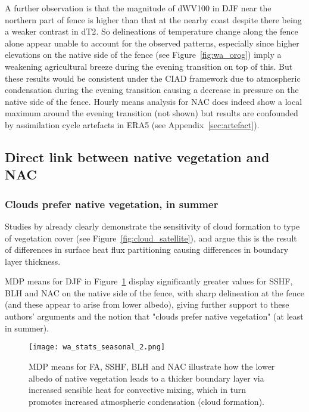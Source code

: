 A further observation is that the magnitude of \ac{dWV100} in \ac{DJF} near the northern part of fence is higher than that at the nearby coast despite there being a weaker contrast in \ac{dT2}. So delineations of temperature change along the fence alone appear unable to account for the observed patterns, especially since higher elevations on the native side of the fence (see Figure~\ref{fig:wa_orog}) imply a weakening agricultural breeze during the evening transition on top of this. But these results would be consistent under the \ac{CIAD} framework due to atmospheric condensation during the evening transition causing a decrease in pressure on the native side of the fence. Hourly means analysis for \ac{NAC} does indeed show a local maximum around the  evening transition (not shown) but results are confounded by assimilation cycle artefacts in \ac{ERA5} (see Appendix~\ref{sec:artefact}).

\subsection{Direct link between native vegetation and NAC}
\label{ssec:native_nac}

\subsubsection{Clouds prefer native vegetation, in summer}

Studies by \citet{lyons1993, lyons1996, lyons2002, ray2003, nair2011} already clearly demonstrate the sensitivity of cloud formation to type of vegetation cover (see Figure~\ref{fig:cloud_satellite}), and argue this is the result of differences in surface heat flux partitioning causing differences in boundary layer thickness.

\ac{MDP} means for \ac{DJF} in Figure~\ref{fig:wa_stats_seasonal_2} display significantly greater values for \ac{SSHF}, \ac{BLH} and \ac{NAC} on the native side of the fence, with sharp delineation at the fence (and these appear to arise from lower albedo), giving further support to these authors' arguments and the notion that "clouds prefer native vegetation" \citep{lyons2002} (at least in summer).

\begin{figure}[!htp]
	\centering
	\texttt{[image: wa\_stats\_seasonal\_2.png]}
	\caption[Selected MDP means with fence delineations]{\acs{MDP} means for \acs{FA}, \acs{SSHF}, \acs{BLH} and \acs{NAC} illustrate how the lower albedo of native vegetation leads to a thicker boundary layer via increased sensible heat for convective mixing, which in turn promotes increased atmospheric condensation (cloud formation).}
	\label{fig:wa_stats_seasonal_2}
\end{figure}

